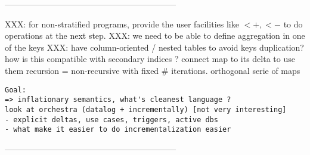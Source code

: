 \documentclass[11pt]{article}
\begin{document}
--------------------------------------------------------------

{\color{red}
XXX: for non-stratified programs, provide the user facilities like $<+, <-$ to do operations at the next step.
XXX: we need to be able to define aggregation in one of the keys
XXX: have column-oriented / nested tables to avoid keys duplication? how is this compatible with secondary indices ?}
connect map to its delta to use them
recursion = non-recursive with fixed \# iterations. orthogonal serie of maps
\begin{verbatim}
Goal:
=> inflationary semantics, what's cleanest language ?
look at orchestra (datalog + incrementally) [not very interesting]
- explicit deltas, use cases, triggers, active dbs
- what make it easier to do incrementalization easier
\end{verbatim}

--------------------------------------------------------------




\def\pdfurl#1{\href{#1}{\footnotesize pdf}}
{\small }
\end{document}
